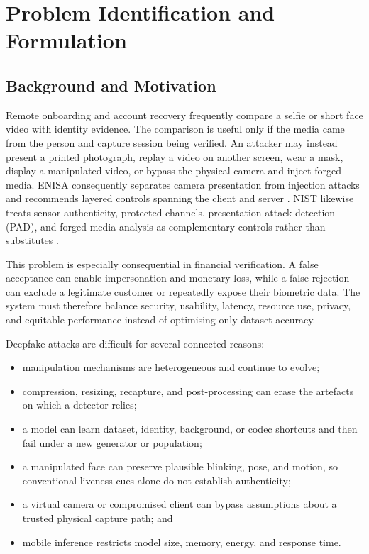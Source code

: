 \chapter{Problem Identification and Formulation}
\label{ch:problem}

\section{Background and Motivation}

Remote onboarding and account recovery frequently compare a selfie or short face
video with identity evidence. The comparison is useful only if the media came
from the person and capture session being verified. An attacker may instead
present a printed photograph, replay a video on another screen, wear a mask,
display a manipulated video, or bypass the physical camera and inject forged
media. ENISA consequently separates camera presentation from injection attacks
and recommends layered controls spanning the client and server
\cite{enisa2022,enisa2024}. NIST likewise treats sensor authenticity, protected
channels, presentation-attack detection (PAD), and forged-media analysis as
complementary controls rather than substitutes \cite{nist80063a4}.

This problem is especially consequential in financial verification. A false
acceptance can enable impersonation and monetary loss, while a false rejection
can exclude a legitimate customer or repeatedly expose their biometric data.
The system must therefore balance security, usability, latency, resource use,
privacy, and equitable performance instead of optimising only dataset accuracy.

Deepfake attacks are difficult for several connected reasons:

\begin{itemize}
  \item manipulation mechanisms are heterogeneous and continue to evolve;
  \item compression, resizing, recapture, and post-processing can erase the
        artefacts on which a detector relies;
  \item a model can learn dataset, identity, background, or codec shortcuts and
        then fail under a new generator or population;
  \item a manipulated face can preserve plausible blinking, pose, and motion, so
        conventional liveness cues alone do not establish authenticity;
  \item a virtual camera or compromised client can bypass assumptions about a
        trusted physical capture path; and
  \item mobile inference restricts model size, memory, energy, and response time.
\end{itemize}

